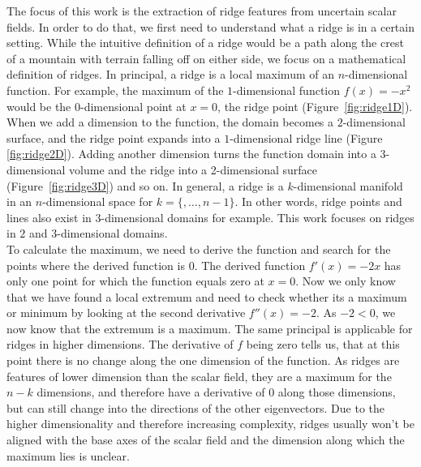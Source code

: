 The focus of this work is the extraction of ridge features from
uncertain scalar fields. In order to do that, we first need to
understand what a ridge is in a certain setting. While the intuitive
definition of a ridge would be a path along the crest of a mountain with
terrain falling off on either side, we focus on a mathematical
definition of ridges. In principal, a ridge is a local maximum of an
$n$-dimensional function. For example, the maximum of the
$1$-dimensional function $f(x) = -x^2$ would be the $0$-dimensional
point at $x=0$, the ridge point (Figure~\ref{fig:ridge1D}). When we add
a dimension to the function, the domain becomes a $2$-dimensional
surface, and the ridge point expands into a $1$-dimensional ridge line
(Figure \ref{fig:ridge2D}). Adding another dimension turns the function
domain into a $3$-dimensional volume and the ridge into a 2-dimensional
surface (Figure~\ref{fig:ridge3D}) and so on. In general, a ridge is a
$k$-dimensional manifold in an $n$-dimensional space for $k=\{,
\dots, n-1\}$. In other words, ridge points and lines also exist in
$3$-dimensional domains for example. This work focuses on ridges in $2$
and $3$-dimensional domains.\\
\indent To calculate the maximum, we need to derive the function and
search for the points where the derived function is $0$. The derived
function $f'(x)=-2x$ has only one point for which the function equals
zero at $x=0$. Now we only know that we have found a local extremum and
need to check whether its a maximum or minimum by looking at the second
derivative $f''(x)=-2$. As $-2 < 0$, we now know that the extremum is a
maximum. The same principal is applicable for ridges in higher
dimensions. The derivative of $f$ being zero tells us, that at this
point there is no change along the one dimension of the function. As
ridges are features of lower dimension than the scalar field, they are a
maximum for the $n-k$ dimensions, and therefore have a derivative of $0$
along those dimensions, but can still change into the directions of the
other eigenvectors. Due to the higher dimensionality and therefore
increasing complexity, ridges usually won't be aligned with the base
axes of the scalar field and the dimension along which the maximum lies
is unclear.\\

